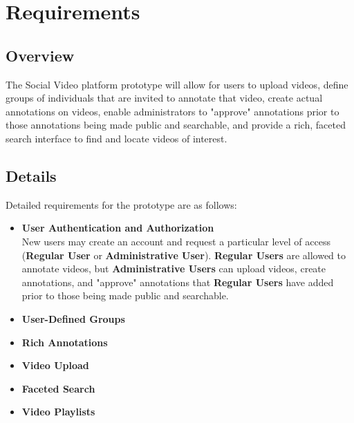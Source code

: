 %
\chapter{Requirements}
\label{sec:requirements}

\section{Overview}
\label{sec:requirements:overview}

The Social Video platform prototype will allow for users to upload videos, define groups of individuals that are invited to annotate that video, create actual annotations on videos, enable administrators to "approve" annotations prior to those annotations being made public and searchable, and provide a rich, faceted search interface to find and locate videos of interest.

\section{Details}
\label{sec:requirements:details}

Detailed requirements for the prototype are as follows:

\begin{itemize}[leftmargin=*]
\item \textbf{User Authentication and Authorization} \\
	New users may create an account and request a particular level of access (\textbf{Regular User} or \textbf{Administrative User}).  \textbf{Regular Users} are allowed to annotate videos, but \textbf{Administrative Users} can upload videos, create annotations, and "approve" annotations that \textbf{Regular Users} have added prior to those being made public and searchable.
\item \textbf{User-Defined Groups} \\

\item \textbf{Rich Annotations} \\

\item \textbf{Video Upload} \\
	
\item \textbf{Faceted Search} \\

\item \textbf{Video Playlists} \\

\end{itemize}



